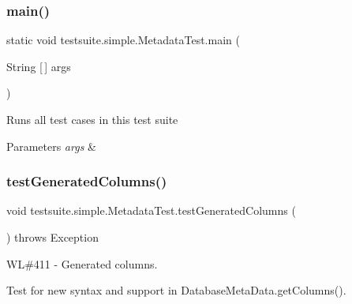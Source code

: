 \subsubsection{\texorpdfstring{main()}{main()}}
{\footnotesize\ttfamily static void testsuite.\+simple.\+Metadata\+Test.\+main (\begin{DoxyParamCaption}\item[{String \mbox{[}$\,$\mbox{]}}]{args }\end{DoxyParamCaption})\hspace{0.3cm}{\ttfamily [static]}}

Runs all test cases in this test suite


\begin{DoxyParams}{Parameters}
{\em args} & \\
\hline
\end{DoxyParams}
\mbox{\label{classtestsuite_1_1simple_1_1_metadata_test_a27296d9b08d2b4d91aa016482c2cef68}} 
\subsubsection{\texorpdfstring{test\+Generated\+Columns()}{testGeneratedColumns()}}
{\footnotesize\ttfamily void testsuite.\+simple.\+Metadata\+Test.\+test\+Generated\+Columns (\begin{DoxyParamCaption}{ }\end{DoxyParamCaption}) throws Exception}

WL\#411 -\/ Generated columns.

Test for new syntax and support in Database\+Meta\+Data.\+get\+Columns().

